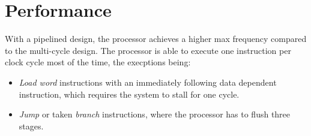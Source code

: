 \section{Performance}
With a pipelined design, the processor achieves a higher max frequency compared to the multi-cycle design.
The processor is able to execute one instruction per clock cycle most of the time,
the execptions being:

\begin{itemize}
    \item \textit{Load word} instructions with an immediately following data dependent instruction,
        which requires the system to stall for one cycle.
    \item \textit{Jump} or taken \textit{branch} instructions,
        where the processor has to flush three stages.
\end{itemize}
